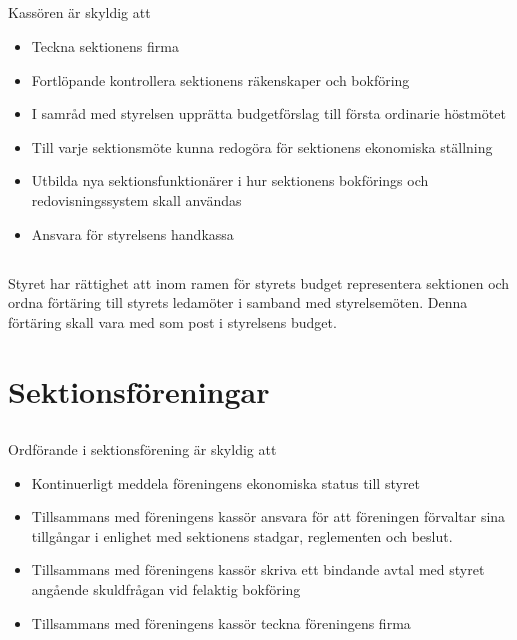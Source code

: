 \documentclass[a4paper, 10pt]{article}
\begin{document}
\subsection{}
Kassören är skyldig att
\begin{itemize}
  \item Teckna sektionens firma
  \item Fortlöpande kontrollera sektionens räkenskaper och bokföring
  \item I samråd med styrelsen upprätta budgetförslag till första ordinarie höstmötet
  \item Till varje sektionsmöte kunna redogöra för sektionens ekonomiska ställning
  \item Utbilda nya sektionsfunktionärer i hur sektionens bokförings och redovisningssystem skall användas
  \item Ansvara för styrelsens handkassa
\end{itemize}
\subsection{}
Styret har rättighet att inom ramen för styrets budget representera sektionen och ordna förtäring till styrets ledamöter i samband med styrelsemöten. Denna förtäring skall vara med som post i styrelsens budget.

\section{Sektionsföreningar}
\label{sec:sektionsforeningar}
\subsection{}
Ordförande i sektionsförening är skyldig att
\begin{itemize}
\item Kontinuerligt meddela föreningens ekonomiska status till styret
\item Tillsammans med föreningens kassör ansvara för att föreningen förvaltar sina tillgångar i enlighet med sektionens stadgar, reglementen och beslut.
\item Tillsammans med föreningens kassör skriva ett bindande avtal med
styret angående skuldfrågan vid felaktig bokföring
\item Tillsammans med föreningens kassör teckna föreningens firma
\end{itemize}
\end{document}

